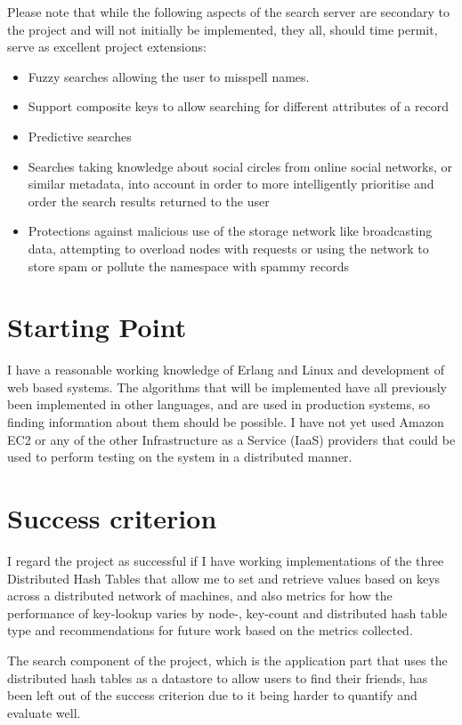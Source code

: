 Please note that while the following aspects of the search server are secondary to the project and will not initially be implemented, they all, should time permit, serve as excellent project extensions:

\begin{itemize}
  \item Fuzzy searches allowing the user to misspell names. 
  \item Support composite keys to allow searching for different attributes of a record
  \item Predictive searches
  \item Searches taking knowledge about social circles from online social networks, or similar metadata, into account in order to more intelligently prioritise and order the search results returned to the user
  \item Protections against malicious use of the storage network like broadcasting data, attempting to overload nodes with requests or using the network to store spam or pollute the namespace with spammy records
\end{itemize}


\section*{Starting Point}

I have a reasonable working knowledge of Erlang and Linux and development of web based systems. The algorithms that will be implemented have all previously been implemented in other languages, and are used in production systems, so finding information about them should be possible. I have not yet used Amazon EC2 or any of the other Infrastructure as a Service (IaaS) providers that could be used to perform testing on the system in a distributed manner.


\section*{Success criterion}

I regard the project as successful if I have working implementations of the three Distributed Hash Tables that allow me to set and retrieve values based on keys across a distributed network of machines, and also metrics for how the performance of key-lookup varies by node-, key-count and distributed hash table type and recommendations for future work based on the metrics collected.

The search component of the project, which is the application part that uses the distributed hash tables as a datastore to allow users to find their friends, has been left out of the success criterion due to it being harder to quantify and evaluate well.

